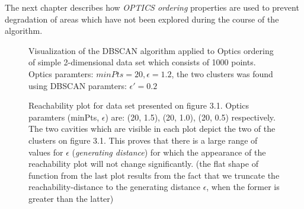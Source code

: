 The next chapter describes how \textit{OPTICS ordering} properties are used
to prevent degradation of areas which have not been explored during the course
of the algorithm. 

\begin{figure}
  \centering
  \caption{Visualization of the DBSCAN algorithm applied to Optics ordering
  of simple 2-dimensional data set which consists of 1000 points. Optics
  paramters: $minPts=20, \epsilon=1.2$, the two clusters was found using DBSCAN
  paramters: $\epsilon'=0.2$ }
  \label{clusters}
\end{figure}


\begin{figure}
  \centering
  \caption{Reachability plot for data set presented on figure 3.1. Optics
  paramters (minPts, $\epsilon$) are: (20, 1.5), (20, 1.0), (20, 0.5)
  respectively. The two cavities which are visible in each plot depict the two
  of the clusters on figure 3.1. This proves that there is a large range of
  values for $\epsilon$ (\textit{generating distance}) for which the appearance
  of the reachability plot will not change significantly. (the flat shape of function from the last plot
  results from the fact that we truncate the reachability-distance to the 
  generating distance $\epsilon$, when the former is greater than the latter)}
  \label{reach}
\end{figure}